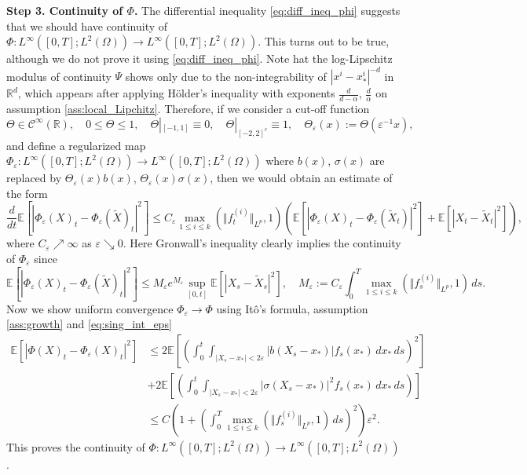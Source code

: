 \documentclass[10pt,oneside]{amsart}
\numberwithin{equation}{section}
\numberwithin{definition}{section}
\numberwithin{theorem}{section}
\numberwithin{lemma}{section}
\begin{document}
%
\textbf{Step 3. Continuity of $\Phi$.} The differential inequality \cref{eq:diff_ineq_phi} suggests that we should have continuity of $\Phi:L^{\infty}\left([0,T];L^{2}(\Omega)\right)\to L^{\infty}\left([0,T];L^{2}(\Omega)\right)$. This turns out to be true, although we do not prove it using \cref{eq:diff_ineq_phi}. Note hat the log-Lipschitz modulus of continuity $\Psi$  shows only due to the non-integrability of $|x^{i}-x_{*}^{i}|^{-d}$ in $\mathbb R^d$, which appears after applying Hölder's inequality with exponents $\frac{d}{d-\alpha}$, $\frac{d}{\alpha}$ on assumption \ref{ass:local_Lipchitz}. Therefore, if we consider a cut-off function
%
\begin{equation*}
  \Theta\in\mathcal{C}^{\infty}(\mathbb{R}),\quad0\leq\Theta\leq1,\quad\Theta|_{[-1,1]}\equiv0,\quad\Theta|_{[-2,2]^{c}}\equiv1,\quad\Theta_{\varepsilon}(x):=\Theta(\varepsilon^{-1}x),
\end{equation*}
%
and define a regularized map $\Phi_{\varepsilon}:L^{\infty}\left([0,T];L^{2}(\Omega)\right)\to L^{\infty}\left([0,T];L^{2}(\Omega)\right)$ where $b(x)$, $\sigma(x)$ are replaced by $\Theta_{\varepsilon}(x)b(x)$, $\Theta_{\varepsilon}(x)\sigma(x)$, then we would obtain an estimate of the form
%
\begin{equation*}
  \frac{d}{dt}\mathbb{E}\left[|\Phi_{\varepsilon}(X)_{t}-\Phi_{\varepsilon}(\tilde{X})_{t}|^{2}\right]\leq
   C_{\varepsilon}\max_{1\leq i\leq k}(\Vert f_{t}^{(i)}\Vert_{L^p},1)\left(\mathbb{E}\left[|\Phi_{\varepsilon}(X)_{t}-\Phi_{\varepsilon}(\tilde{X}_{t})|^{2}\right]+
   \mathbb{E}\left[|X_{t}-\tilde{X}_{t}|^{2}\right]\right),
\end{equation*}
%
where $C_{\varepsilon}\nearrow\infty$  as $\varepsilon\searrow 0$. Here Gronwall's inequality clearly implies the continuity of $\Phi_{\varepsilon}$ since
%
\begin{equation*}
  \mathbb{E}\left[|\Phi_{\varepsilon}(X)_{t}-\Phi_{\varepsilon}(\tilde{X})_{t}|^{2}\right]\leq 
  M_\varepsilon e^{M_\varepsilon}\sup_{[0,t]}\mathbb{E}\left[|X_{s}-\tilde{X}_{s}|^{2}\right],
  \quad M_\varepsilon:=C_{\varepsilon}\int_{0}^{T}\max_{1\leq i\leq k}(\Vert f_{s}^{(i)}\Vert_{L^{p}},1)\,ds.
\end{equation*}
%
Now we show uniform convergence $\Phi_{\varepsilon}\to\Phi$ using Itô's formula, assumption \ref{ass:growth} and \cref{eq:sing_int_eps}
%
\begin{align*}
  \mathbb{E}\left[\left|\Phi(X)_{t}-\Phi_{\varepsilon}(X)_{t}\right|^{2}\right] &
  \leq2\mathbb{E}\left[\left(\int_{0}^{t}\int_{|X_{s}-x_{*}|<2\varepsilon}\left|b(X_{s}-x_{*})\right|f_{s}(x_{*})\,dx_{*}\,ds\right)^{2}\right]	\\
  & +2\mathbb{E}\left[\left(\int_{0}^{t}\int_{|X_{s}-x_{*}|<2\varepsilon}\left|\sigma(X_{s}-x_{*})\right|^{2}f_{s}(x_{*})\,dx_{*}\,ds\right)\right]\\
  & \leq C\left(1+\left(\int_{0}^{T}\max_{1\leq i\leq k}(\Vert f_{s}^{(i)}\Vert_{L^p},1)\,ds\right)^{2}\right)\varepsilon^{2}.
\end{align*}
%
This proves the continuity of $\Phi:L^{\infty}\left([0,T];L^{2}(\Omega)\right)\to L^{\infty}\left([0,T];L^{2}(\Omega)\right)$. 
% 
\end{document}
